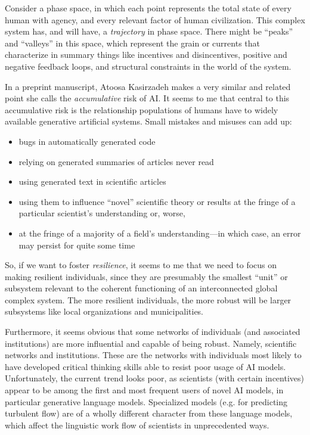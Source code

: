 \documentclass[11pt, oneside]{article}   	%
\begin{document}
Consider a phase space, in which each point represents the total state of every human with agency, and every relevant factor of human civilization.  This complex system has, and will have, a \emph{trajectory} in phase space.  There might be ``peaks'' and ``valleys'' in this space, which represent the grain or currents that characterize in summary things like incentives and disincentives, positive and negative feedback loops, and structural constraints in the world of the system.



In a preprint manuscript, Atoosa Kasirzadeh makes a very similar and related point she calls the \emph{accumulative} risk of AI. \citep{Kasirzadeh2024WIP}  It seems to me that central to this accumulative risk is the relationship populations of humans have to widely available generative artificial systems.  Small mistakes and misuses can add up: 

\begin{itemize}
    \item bugs in automatically generated code
    \item relying on generated summaries of articles never read
    \item using generated text in scientific articles
    \item using them to influence ``novel'' scientific theory or results at the fringe of a particular scientist's understanding or, worse, 
    \item at the fringe of a majority of a field's understanding---in which case, an error may persist for quite some time
\end{itemize}

So, if we want to foster \emph{resilience}, it seems to me that we need to focus on making resilient individuals, since they are presumably the smallest ``unit'' or subsystem relevant to the coherent functioning of an interconnected global complex system.  The more resilient individuals, the more robust will be larger subsystems like local organizations and municipalities.

Furthermore, it seems obvious that some networks of individuals (and associated institutions) are more influential and capable of being robust.  Namely, scientific networks and institutions.  These are the networks with individuals most likely to have developed critical thinking skills able to resist poor usage of AI models.  Unfortunately, the current trend looks poor, as scientists (with certain incentives) appear to be among the first and most frequent users of novel AI models, in particular generative language models.  Specialized models (e.g. for predicting turbulent flow) are of a wholly different character from these language models, which affect the linguistic work flow of scientists in unprecedented ways.
\end{document}
